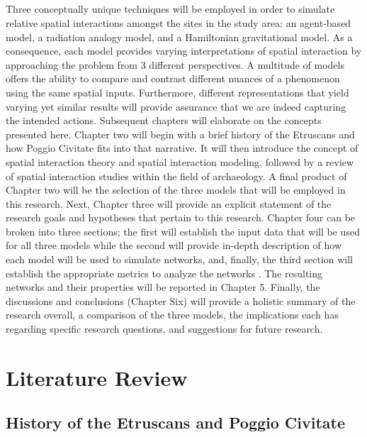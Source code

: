 \documentclass[12pt,a4paper]{thesis}
\begin{document}
\paragraph{}
Three conceptually unique techniques will be employed in order to simulate relative spatial interactions amongst the sites in the study area: an agent-based model, a radiation analogy model, and a Hamiltonian gravitational model. As a consequence, each model provides varying interpretations of spatial interaction by approaching the problem from 3 different perspectives. A multitude of models offers the ability to compare and contrast different nuances of a phenomenon using the same spatial inputs. Furthermore, different representations that yield varying yet similar results will provide assurance that we are indeed capturing the intended actions.
Subsequent chapters will elaborate on the concepts presented here. Chapter two will begin with a brief history of the Etruscans  and how Poggio Civitate fits into that narrative. It will then introduce the concept of spatial interaction theory and spatial interaction modeling, followed by a review of spatial interaction studies within the field of archaeology. A final product of Chapter two will be the selection of the three models that will be employed in this research.  Next, Chapter three will provide an explicit statement of the research goals and hypotheses that pertain to this research. Chapter four can be broken into three sections; the first will establish the input data that will be used for all three models while the second will provide in-depth description of how each model will be used to simulate networks, and, finally, the third section will establish the appropriate metrics to analyze the networks . The resulting networks and their properties will be reported in Chapter 5. Finally, the discussions and conclusions (Chapter Six) will provide a holistic summary of the research overall, a comparison of the three models, the implications each has regarding specific research questions, and suggestions for future research.

\chapter{Literature Review}
\section{History of the Etruscans and Poggio Civitate}
\end{document}

